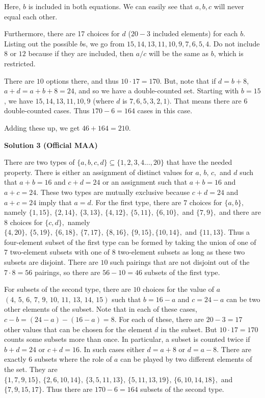 \begin{enumerate}
 Here, $b$ is included in both equations. We can easily see that $a, b, c$ will never equal each other. 

 Furthermore, there are 17 choices for $d$ ($20 - 3$ included elements) for each $b$. Listing out the possible $b$s, we go from $15,14,13,11,10,9,7,6,5,4$. Do not include $8$ or $12$ because if they are included, then $a/c$ will be the same as $b$, which is restricted. 

 There are $10$ options there, and thus $10 \cdot 17 = 170$. But, note that if $d = b+8$, $a+d = a+b+8 = 24$, and so we have a double-counted set. Starting with $b=15$, we have $15, 14, 13, 11, 10, 9$ (where $d$ is $7, 6, 5, 3, 2, 1)$. That means there are $6$ double-counted cases. Thus $170 - 6 = 164$ cases in this case.

 Adding these up, we get $46+164 = \boxed{210}.$




\textbf{Solution 3 (Official MAA)}

There are two types of $\{a,b,c,d\} \subseteq \{1,2,3,4\dots,20\}$ that have the needed property. There is either an assignment of distinct values for $a,\,b,\,c,$ and $d$ such that $a+b=16$ and $c+d=24$ or an assignment such that $a+b=16$ and $a+c=24.$ These two types are mutually exclusive because $c+d=24$ and $a+c=24$ imply that $a=d.$ For the first type, there are $7$ choices for $\{a,b\},$ namely $\{1,15\},\,\{2,14\},\,\{3,13\},\,\{4,12\},\,\{5,11\},\,\{6,10\},$ and $\{7,9\},$ and there are $8$ choices for $\{c,d\},$ namely $\{4,20\},\,\{5,19\},\,\{6,18\},\,\{7,17\},\,\{8,16\},\,\{9,15\},\{10,14\},$ and $\{11,13\}.$ Thus a four-element subset of the first type can be formed by taking the union of one of $7$ two-element subsets with one of $8$ two-element subsets as long as these two subsets are disjoint. There are $10$ such pairings that are not disjoint out of the $7\cdot 8=56$ pairings, so there are $56-10=46$ subsets of the first type.

 For subsets of the second type, there are $10$ choices for the value of $a$ $(4,\,5,\,6,\,7,\,9,\,10,\,11,\,13,\,14,\,15)$ such that $b=16-a$ and $c=24-a$ can be two other elements of the subset. Note that in each of these cases, $c-b=(24-a)-(16-a)=8.$ For each of these, there are $20-3=17$ other values that can be chosen for the element $d$ in the subset. But $10\cdot 17=170$ counts some subsets more than once. In particular, a subset is counted twice if $b+d=24$ or $c+d=16$. In such cases either $d=a+8$ or $d=a-8$. There are exactly $6$ subsets where the role of $a$ can be played by two different elements of the set. They are $\{1,7,9,15\},\,\{2,6,10,14\},\,\{3,5,11,13\},\,\{5,11,13,19\},\,\{6,10,14,18\},$ and $\{7,9,15,17\}$. Thus there are $170-6=164$ subsets of the second type.


\end{enumerate}
